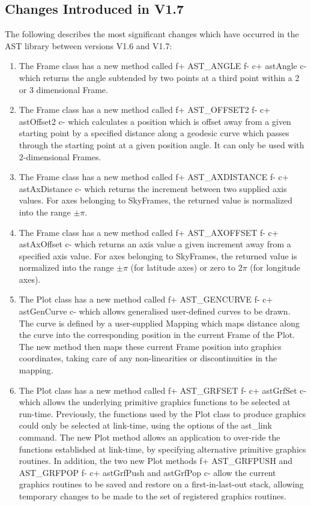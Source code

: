\documentclass[twoside,11pt]{article}
\begin{document}
\subsection{Changes Introduced in V1.7}

The following describes the most significant changes which have
occurred in the AST library between versions V1.6 and V1.7:

\begin{enumerate}

\item The Frame class has a new method called
f+
AST\_ANGLE
f-
c+
astAngle
c-
which returns the angle subtended by two points at a third point within a
2 or 3 dimensional Frame.

\item The Frame class has a new method called
f+
AST\_OFFSET2
f-
c+
astOffset2
c-
which calculates a position which is offset away from a given starting
point by a specified distance along a geodesic curve which passes
through the starting point at a given position angle. It can only be used
with 2-dimensional Frames.

\item The Frame class has a new method called
f+
AST\_AXDISTANCE
f-
c+
astAxDistance
c-
which returns the increment between two supplied axis values. For
axes belonging to SkyFrames, the returned value is normalized into
the range $\pm\pi$.

\item The Frame class has a new method called
f+
AST\_AXOFFSET
f-
c+
astAxOffset
c-
which returns an axis value a given increment away from a specified axis
value. For axes belonging to SkyFrames, the returned value is normalized into
the range $\pm\pi$ (for latitude axes) or zero to $2\pi$ (for longitude
axes).

\item The Plot class has a new method called
f+
AST\_GENCURVE
f-
c+
astGenCurve
c-
which allows generalised user-defined curves to be drawn. The curve is
defined by a user-supplied Mapping which maps distance along the curve
into the corresponding position in the current Frame of the Plot. The new
method then maps these current Frame position into graphics coordinates,
taking care of any non-linearities or discontinuities in the mapping.

\item The Plot class has a new method called
f+
AST\_GRFSET
f-
c+
astGrfSet
c-
which allows the underlying primitive graphics functions to be selected
at run-time. Previously, the functions used by the Plot class to produce
graphics could only be selected at link-time, using the options of the
ast\_link command. The new Plot method allows an application to over-ride
the functions established at link-time, by specifying alternative
primitive graphics routines. In addition, the two new Plot methods
f+
AST\_GRFPUSH and AST\_GRFPOP
f-
c+
astGrfPush and astGrfPop
c-
allow the current graphics routines to be saved and restore on a
first-in-last-out stack, allowing temporary changes to be made to the set
of registered graphics routines.


\end{enumerate}
\end{document}
